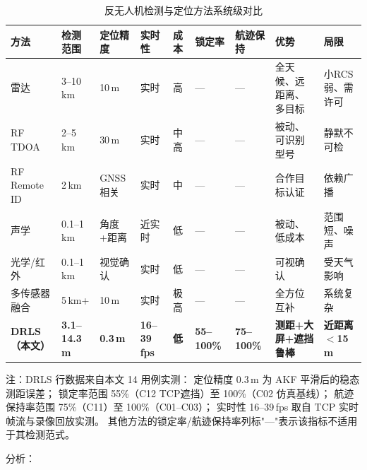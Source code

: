\documentclass[12pt, a4paper]{ctexart}
\begin{document}
\begin{table}[H]
\centering
\caption{反无人机检测与定位方法系统级对比}
\label{tab:system_compare}
\small
\begin{tabular}{p{2.2cm}p{1.6cm}p{1.3cm}p{1.2cm}p{1.0cm}p{1.2cm}p{1.5cm}p{2cm}p{1.8cm}}
\toprule
\textbf{方法} & \textbf{检测范围} & \textbf{定位精度} & \textbf{实时性} & \textbf{成本} & \textbf{锁定率} & \textbf{航迹保持} & \textbf{优势} & \textbf{局限} \\
\midrule
雷达\cite{radar_cuav} & 3--10\,km & 10\,m & 实时 & 高 & — & — & 全天候、远距离、多目标 & 小RCS弱、需许可 \\
RF TDOA\cite{rf_drone} & 2--5\,km & 30\,m & 实时 & 中高 & — & — & 被动、可识别型号 & 静默不可检 \\
RF Remote ID\cite{rf_remoteid} & 2\,km & GNSS相关 & 实时 & 中 & — & — & 合作目标认证 & 依赖广播 \\
声学\cite{acoustic_drone} & 0.1--1\,km & 角度+距离 & 近实时 & 低 & — & — & 被动、低成本 & 范围短、噪声 \\
光学/红外\cite{optical_cuav} & 0.1--1\,km & 视觉确认 & 实时 & 低 & — & — & 可视确认 & 受天气影响 \\
多传感器融合\cite{fusion_cuav} & 5\,km+ & 10\,m & 实时 & 极高 & — & — & 全方位互补 & 系统复杂 \\
\textbf{DRLS（本文）} & \textbf{3.1--14.3\,m} & \textbf{0.3\,m} & \textbf{16--39\,fps} & \textbf{低} & \textbf{55--100\%} & \textbf{75--100\%} & \textbf{测距+大屏+遮挡鲁棒} & \textbf{近距离$<$15\,m} \\
\bottomrule
\end{tabular}
\end{table}

注：DRLS 行数据来自本文 14 用例实测：
定位精度 0.3\,m 为 AKF 平滑后的稳态测距误差；
锁定率范围 55\%（C12 TCP遮挡）至 100\%（C02 仿真基线）；
航迹保持率范围 75\%（C11）至 100\%（C01--C03）；
实时性 16--39\,fps 取自 TCP 实时帧流与录像回放实测。
其他方法的锁定率/航迹保持率列标"—"表示该指标不适用于其检测范式。

分析：
\end{document}
